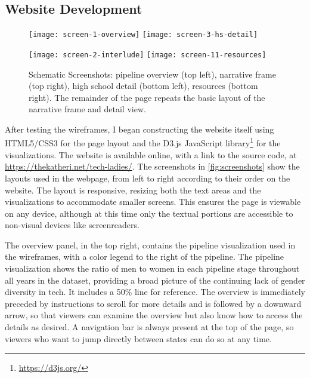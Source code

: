 \subsection{Website Development}\label{sec:dev-website}
\begin{figure}
  \begin{minipage}{0.49\textwidth}
    \texttt{[image: screen-1-overview]}
    \texttt{[image: screen-3-hs-detail]}
  \end{minipage}
  \begin{minipage}{0.49\textwidth}
    \texttt{[image: screen-2-interlude]}
    \texttt{[image: screen-11-resources]}
  \end{minipage}
  \caption{Schematic Screenshots: pipeline overview (top left), narrative frame (top right), high school detail (bottom left), resources (bottom right). The remainder of the page repeats the basic layout of the narrative frame and detail view.}\label{fig:screenshots}
\end{figure}

After testing the wireframes, I began constructing the website itself using HTML5/CSS3 for the page layout and the D3.js JavaScript library\footnote{\url{https://d3js.org/}} for the visualizations. The website is available online, with a link to the source code, at \url{https://thekatheri.net/tech-ladies/}. The screenshots in \autoref{fig:screenshots} show the layouts used in the webpage, from left to right according to their order on the website. The layout is responsive, resizing both the text areas and the visualizations to accommodate smaller screens. This ensures the page is viewable on any device, although at this time only the textual portions are accessible to non-visual devices like screenreaders.

The overview panel, in the top right, contains the pipeline visualization used in the wireframes, with a color legend to the right of the pipeline. The pipeline visualization shows the ratio of men to women in each pipeline stage throughout all years in the dataset, providing a broad picture of the continuing lack of gender diversity in tech. It includes a 50\% line for reference. The overview is immediately preceded by instructions to scroll for more details and is followed by a downward arrow, so that viewers can examine the overview but also know how to access the details as desired. A navigation bar is always present at the top of the page, so viewers who want to jump directly between states can do so at any time.

